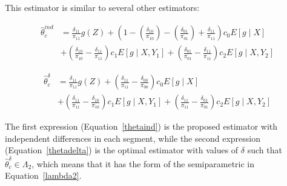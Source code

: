 \documentclass[12pt]{article}
\begin{document}
This estimator is similar to several other estimators:

\begin{align}\label{thetaind}
  \hat \theta^{ind}_c 
  &= \frac{\delta_{11}}{\pi_{11}} g(Z) + \left(1 -
    \left(\frac{\delta_{10}}{\pi_{10}}\right) -
    \left(\frac{\delta_{01}}{\pi_{01}}\right) + 
  \frac{\delta_{11}}{\pi_{11}}\right) c_0 E[g \mid X] \\ \nonumber
  &+
  \left(\frac{\delta_{10}}{\pi_{10}} - 
  \frac{\delta_{11}}{\pi_{11}}\right) c_1 E[g \mid X, Y_1] +
  \left(\frac{\delta_{01}}{\pi_{01}} - 
  \frac{\delta_{11}}{\pi_{11}}\right) c_2 E[g \mid X, Y_2]
\end{align}

\begin{align}\label{thetadelta}
  \hat \theta^{\delta}_c 
  &= \frac{\delta_{11}}{\pi_{11}} g(Z) 
  + \left(\frac{\delta_{11}}{\pi_{11}} - \frac{\delta_{00}}{\pi_{00}}\right) 
   c_0 E[g \mid X] \\ \nonumber
  &+
  \left(\frac{\delta_{11}}{\pi_{11}} - 
  \frac{\delta_{10}}{\pi_{10}}\right) c_1 E[g \mid X, Y_1] +
  \left(\frac{\delta_{11}}{\pi_{11}} - 
  \frac{\delta_{01}}{\pi_{01}}\right) c_2 E[g \mid X, Y_2]
\end{align}

The first expression (Equation~\ref{thetaind}) is the proposed estimator 
with independent differences in each segment, while the second expression 
(Equation~\ref{thetadelta}) is the optimal estimator with values of $\delta$
such that $\hat \theta^{\delta}_c \in \Lambda_2$, which means that it has 
the form of the semiparametric in Equation~\ref{lambda2}.
\end{document}
